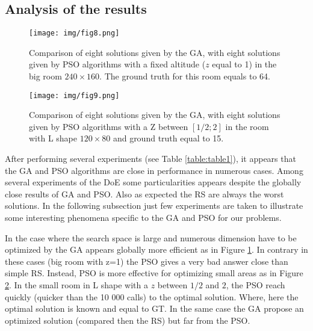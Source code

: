 \subsection{Analysis of the results }

\begin{figure}[!]
  \texttt{[image: img/fig8.png]}
  \caption{Comparison of eight solutions given by the GA, with eight solutions given by PSO algorithms with a fixed altitude ($z$ equal to 1) in the big room $240\times160$. The ground truth for this room equals to 64.}
  \label{fig:bigRz1}
   \endminipage\hfill
\end{figure}
%
%
\begin{figure}[!]
  \texttt{[image: img/fig9.png]}
  \caption{Comparison of eight solutions given by the GA, with eight solutions given by PSO algorithms with a Z between $[1/2; 2]$ in the room with L shape $120\times80$ and ground truth equal to 15.}\label{fig:RLz2}
   \endminipage\hfill
\end{figure}
After performing several experiments (see Table \ref{table:table1}), it appears that the GA and PSO algorithms are close in performance in numerous cases. Among several experiments of the DoE some particularities appears despite the globally close results of GA and PSO. Also as expected the RS are always the worst solutions.
 In the following subsection just few experiments are taken to illustrate some interesting phenomena specific to the GA and PSO for our problems.

In the case where the search space is large and numerous dimension have to be optimized by the GA appears globally more efficient as in Figure \ref{fig:bigRz1}. In contrary in these cases (big room with z=1) the PSO gives a very bad answer close than simple RS.
 Instead, PSO is more effective for optimizing small areas as in Figure \ref{fig:RLz2}. In the small room in L shape with a $z$ between $1/2$ and $2$, the PSO reach quickly (quicker than the 10 000 calls) to the optimal solution. Where, here the optimal solution is known and equal to GT. In the same case the GA propose an optimized solution (compared then the RS) but far from the PSO.
 
